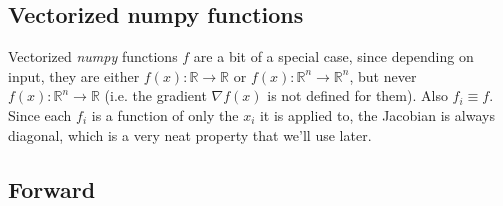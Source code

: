 \documentclass[paper=a4,11pt,headsepline]{scrartcl}
\newcommand{\ve}[1]{\ensuremath{\bm{\mathit{#1}}}}
\newcommand{\ra}{\ensuremath{\rightarrow}}
\newcommand{\soft}[1]{\textsl{#1}\xspace}
\newcommand{\numpy}{\soft{numpy}}
\begin{document}
\subsection{Vectorized numpy functions}

Vectorized \numpy functions $f$ are a bit of a special case, since depending on
input, they are either $f(x):\mathbb R\ra\mathbb R$ or $\ve f(\ve x):\mathbb
R^n\ra\mathbb R^n$, but never $f(\ve x): \mathbb R^n \ra \mathbb R$ (i.e. the
gradient $\nabla f(\ve x)$ is not defined for them). Also $f_i\equiv f$. Since
each $f_i$ is a function of only the $x_i$ it is applied to, the Jacobian is
always diagonal, which is a very neat property that we'll use later.

\subsection{Forward}
\end{document}
